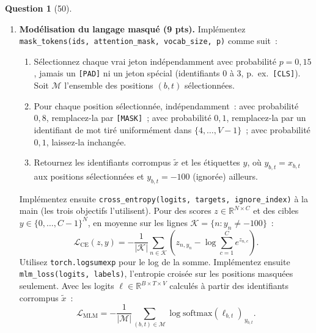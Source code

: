 \documentclass[12pt]{article}
\theoremstyle{definition}
\newtheorem{exercise}{Question}%
\begin{document}
\begin{exercise}[50]
\begin{enumerate}
  Implémentez ensuite \texttt{Encoder.forward(ids, attention\_mask, return\_logits)}~: construisez le masque,
  calculez les plongements des identifiants, appliquez les $L$ blocs dans l'ordre pour obtenir $O$, puis la tête MLM.
  Ainsi, le score du mot $w$ à la position $t$ est
  \[
    \ell_{t,w} = o_t^\top E_w + c_w, \qquad \ell = O E^\top + c \in \mathbb{R}^{T \times V},
  \]
  où $c \in \mathbb{R}^V$ est un biais appris. Un mot obtient un score élevé quand le vecteur caché est proche du
  plongement de ce mot.

  \item \textbf{Modélisation du langage masqué (9 pts).} Implémentez
  \texttt{mask\_tokens(ids, attention\_mask, vocab\_size, p)} comme suit~:
  \begin{enumerate}
    \item Sélectionnez chaque vrai jeton indépendamment avec probabilité $p = 0{,}15$, jamais un \texttt{[PAD]} ni
          un jeton spécial (identifiants 0 à 3, p.\ ex.\ \texttt{[CLS]}). Soit $\mathcal{M}$ l'ensemble des
          positions $(b, t)$ sélectionnées.
    \item Pour chaque position sélectionnée, indépendamment~: avec probabilité $0{,}8$, remplacez-la par
          \texttt{[MASK]}~; avec probabilité $0{,}1$, remplacez-la par un identifiant de mot tiré uniformément dans
          $\{4, \dots, V-1\}$~; avec probabilité $0{,}1$, laissez-la inchangée.
    \item Retournez les identifiants corrompus $\tilde{x}$ et les étiquettes $y$, où $y_{b,t} = x_{b,t}$ aux
          positions sélectionnées et $y_{b,t} = -100$ (ignorée) ailleurs.
  \end{enumerate}


  Implémentez ensuite \texttt{cross\_entropy(logits, targets, ignore\_index)} à la main (les trois objectifs
  l'utilisent). Pour des scores $z \in \mathbb{R}^{N \times C}$ et des cibles $y \in \{0, \dots, C-1\}^N$, en
  moyenne sur les lignes $\mathcal{K} = \{n : y_n \ne -100\}$~:
  \[
    \mathcal{L}_{\text{CE}}(z, y) = -\frac{1}{|\mathcal{K}|} \sum_{n \in \mathcal{K}}
      \left( z_{n, y_n} - \log \sum_{c=1}^{C} e^{z_{n,c}} \right).
  \]
  Utilisez \texttt{torch.logsumexp} pour le log de la somme. Implémentez ensuite
  \texttt{mlm\_loss(logits, labels)}, l'entropie croisée sur les positions masquées seulement. Avec les logits
  $\ell \in \mathbb{R}^{B \times T \times V}$ calculés à partir des identifiants corrompus $\tilde{x}$~:
  \[
    \mathcal{L}_{\text{MLM}} = -\frac{1}{|\mathcal{M}|} \sum_{(b,t) \in \mathcal{M}}
      \log \mathrm{softmax}(\ell_{b,t})_{\,y_{b,t}}.
  \]


\end{enumerate}
\end{exercise}
\end{document}
